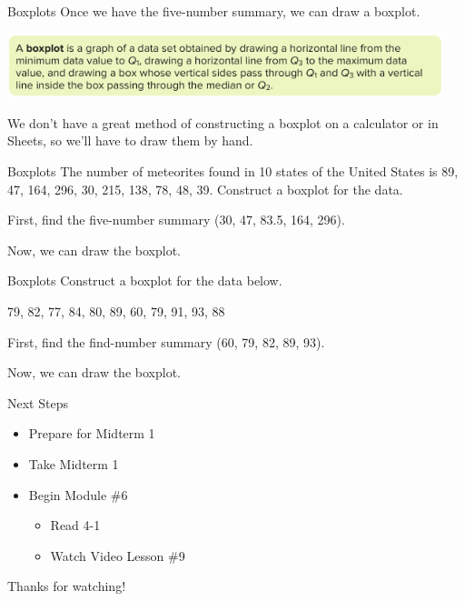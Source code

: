 \documentclass[t, aspectratio=169]{beamer}
\newcommand{\?}{\stackrel{?}{=}}
\begin{document}
	\begin{frame}{Boxplots}
		Once we have the five-number summary, we can draw a boxplot. \pause
		
		\includegraphics[width=5in]{box-def.png} \pause
		
		We don't have a great method of constructing a boxplot on a calculator or in Sheets, so we'll have to draw them by hand.
	\end{frame}

	\begin{frame}{Boxplots}
		The number of meteorites found in 10 states of the United States is 89, 47, 164, 296, 30, 215, 138, 78, 48, 39. Construct a boxplot for the data. \pause
		
		First, find the five-number summary (30, 47, 83.5, 164, 296). \pause
		
		Now, we can draw the boxplot.
	\end{frame}

	\begin{frame}{Boxplots}
		Construct a boxplot for the data below.
		
		79, 82, 77, 84, 80, 89, 60, 79, 91, 93, 88
		
		First, find the find-number summary (60, 79, 82, 89, 93). \pause
		
		Now, we can draw the boxplot.
	\end{frame}

	\begin{frame}{Next Steps}
		\begin{itemize}
			\item Prepare for Midterm 1
			\item Take Midterm 1
			\item Begin Module \#6 \begin{itemize}
				\item Read 4-1
				\item Watch Video Lesson \#9
			\end{itemize}
		\end{itemize}
	
		\vfill
		
		Thanks for watching!
	\end{frame}
	
\end{document}
